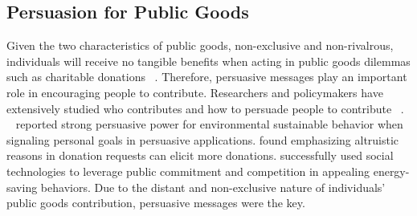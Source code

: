 \subsection{Persuasion for Public Goods}
Given the two characteristics of public goods, non-exclusive and non-rivalrous, individuals will receive no tangible benefits when acting in public goods dilemmas such as charitable donations ~\cite{marwell1981economists,isaac1982public}. Therefore, persuasive messages play an important role in encouraging people to contribute. Researchers and policymakers have extensively studied who contributes and how to persuade people to contribute ~\cite{olson2009logic,becker1974theory,andreoni1990impure,miguel2005ethnic,burnett1981psychographic,pessemier1977willingness,burnett1981psychographic}. ~\textcite{midden2008using} reported strong persuasive power for environmental sustainable behavior when signaling personal goals in persuasive applications. \textcite{feiler2012mixed} found emphasizing altruistic reasons in donation requests can elicit more donations. \textcite{mankoff2010stepgreen} successfully used social technologies to leverage public commitment and competition in appealing energy-saving behaviors. Due to the distant and non-exclusive nature of individuals' public goods contribution, persuasive messages were the key. 


